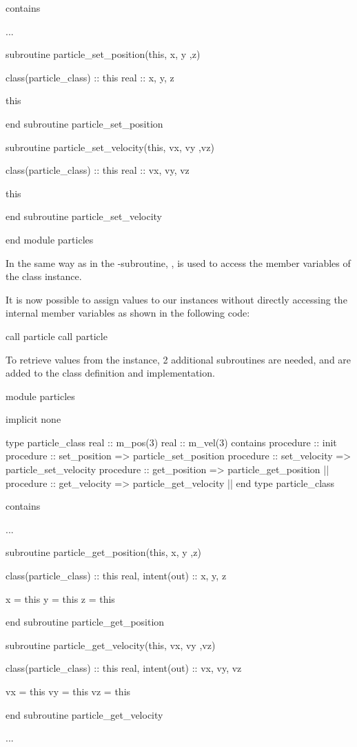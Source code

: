 \begin{fortrancodeenv}
contains

...

subroutine particle_set_position(this, x, y ,z)

    class(particle_class) :: this
    real :: x, y, z

    this %

end subroutine particle_set_position

subroutine particle_set_velocity(this, vx, vy ,vz)

    class(particle_class) :: this
    real :: vx, vy, vz

    this %

end subroutine particle_set_velocity

end module particles
\end{fortrancodeenv}

In the same way as in the -subroutine, , is used to access the member variables of the class instance.

It is now possible to assign values to our instances without directly accessing the internal member variables as shown in the following code:

\begin{fortrancodeenv}
call particle %
call particle %
\end{fortrancodeenv}

To retrieve values from the instance, 2 additional subroutines are needed,  and  are added to the class definition and implementation.

\begin{fortrancodeenv}
module particles

    implicit none

    type particle_class
        real :: m_pos(3)
        real :: m_vel(3)
    contains
        procedure :: init
        procedure :: set_position => particle_set_position
        procedure :: set_velocity => particle_set_velocity
        procedure :: get_position => particle_get_position |\hladded|
        procedure :: get_velocity => particle_get_velocity |\hladded|
    end type particle_class

contains

...

subroutine particle_get_position(this, x, y ,z)

    class(particle_class) :: this
    real, intent(out) :: x, y, z

    x = this %
    y = this %
    z = this %

end subroutine particle_get_position

subroutine particle_get_velocity(this, vx, vy ,vz)

    class(particle_class) :: this
    real, intent(out) :: vx, vy, vz

    vx = this %
    vy = this %
    vz = this %

end subroutine particle_get_velocity

...
\end{fortrancodeenv}


